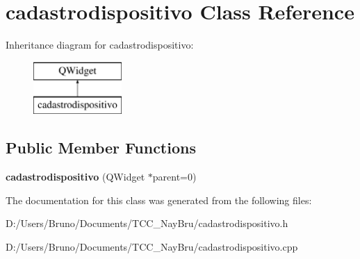 \section{cadastrodispositivo Class Reference}
\label{classcadastrodispositivo}
Inheritance diagram for cadastrodispositivo\+:\begin{figure}[H]
\begin{center}
\leavevmode
\includegraphics[height=2.000000cm]{classcadastrodispositivo}
\end{center}
\end{figure}
\subsection*{Public Member Functions}
\begin{DoxyCompactItemize}
\item 
{\bfseries cadastrodispositivo} (Q\+Widget $\ast$parent=0)\label{classcadastrodispositivo_a759ec481f21cb002c55d5ca50e8cdf9c}

\end{DoxyCompactItemize}


The documentation for this class was generated from the following files\+:\begin{DoxyCompactItemize}
\item 
D\+:/\+Users/\+Bruno/\+Documents/\+T\+C\+C\+\_\+\+Nay\+Bru/cadastrodispositivo.\+h\item 
D\+:/\+Users/\+Bruno/\+Documents/\+T\+C\+C\+\_\+\+Nay\+Bru/cadastrodispositivo.\+cpp\end{DoxyCompactItemize}
